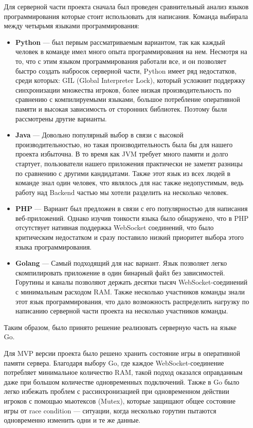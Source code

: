 Для серверной части проекта сначала был проведен сравнительный анализ языков программирования которые стоит использовать для написания. Команда выбирала между четырьмя языками программирования:
\begin{itemize}
\item \textbf{Python} — был первым рассматриваемым вариантом, так как каждый человек в команде имел много опыта программирования на нем. Несмотря на то, что с этим языком программирования работали все, и он позволяет быстро создать набросок серверной части, Python имеет ряд недостатков, среди которых: GIL (Global Interpreter Lock), который усложнит поддержку синхронизации множества игроков, более низкая производительность по сравнению с компилируемыми языками, большое потребление оперативной памяти и высокая зависимость от сторонних библиотек. Поэтому были рассмотрены другие варианты.~\cite{high-perf-python}
\item \textbf{Java} — Довольно популярный выбор в связи с высокой производительностью, но такая производительность была бы для нашего проекта избыточна. В то время как JVM требует много памяти и долго стартует, пользователи нашего приложения практически не заметят разницы по сравнению с другими кандидатами. Также этот язык из всех людей в команде знал один человек, что являлось для нас также недопустимым, ведь работу над Backend частью мы хотели разделить на несколько человек.
\item \textbf{PHP} — Вариант был предложен в связи с его популярностью для написания веб-приложений. Однако изучив тонкости языка было обнаружено, что в PHP отсутствует нативная поддержка WebSocket соединений, что было критическим недостатком и сразу поставило низкий приоритет выбора этого языка программирования.~\cite{PHP-book}
\item \textbf{Golang} — Самый подходящий для нас вариант. Язык позволяет легко скомпилировать приложение в один бинарный файл без зависимостей. Горутины и каналы позволяют держать десятки тысяч WebSocket-соединений с минимальным расходом RAM. Также несколько участников команды знали этот язык программирования, что дало возможность распределить нагрузку по написанию серверной части проекта на несколько участников команды.~\cite{donovan-go}
\end{itemize}

Таким образом, было принято решение реализовать серверную часть на языке Go.

Для MVP версии проекта было решено хранить состояние игры в оперативной памяти сервера. Благодаря выбору Go, где каждое WebSocket-соединение потребляет минимальное количество RAM, такой подход оказался оправданным даже при большом количестве одновременных подключений. Также в Go было легко избежать проблем с рассинхронизацией при одновременном действии игроков с помощью мьютексов (Mutex), которые защищают общее состояние игры от race condition — ситуации, когда несколько горутин пытаются одновременно изменить одни и те же данные.

